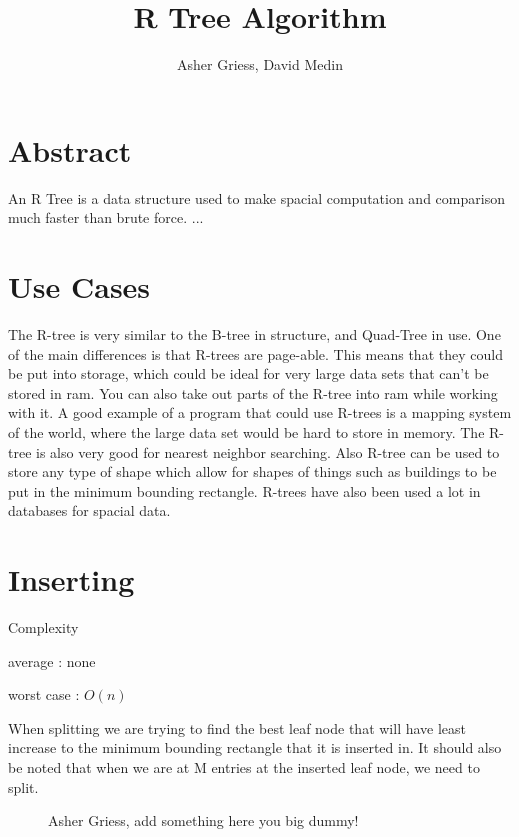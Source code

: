 \documentclass{article}
\author{Asher Griess, David Medin}
\title{R Tree Algorithm}
\begin{document}
\maketitle

\section{Abstract}
An R Tree is a data structure used to make spacial computation and comparison much faster than brute force.  ...

\section{Use Cases}
The R-tree is very similar to the B-tree in structure, and Quad-Tree in use. One of the main differences is that
R-trees are page-able. This means that they could be put into storage, which could be ideal for very large data sets 
that can't be stored in ram. You can also take out parts of the R-tree into ram while working with it. A good example
of a program that could use R-trees is a mapping system of the world, where the large data set would be hard to store in memory.
The R-tree is also very good for nearest neighbor searching. Also R-tree can be used to store any type of shape which allow for shapes
of things such as buildings to be put in the minimum bounding rectangle. R-trees have also been used a lot in databases for spacial data.


\section{Inserting}
Complexity

average : none

worst case : $O(n)$

When splitting we are trying to find the best leaf node
that will have least increase to the minimum bounding rectangle that it is inserted in.
It should also be noted that when we are at M entries at the inserted leaf node, we
need to split.

\begin{figure}
\caption{Asher Griess, add something here you big dummy!}
\centering
{}
\end{figure}
\end{document}
